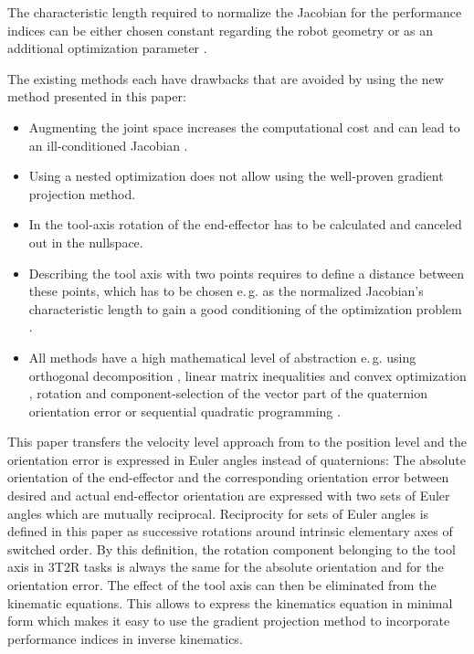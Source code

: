 \documentclass[twocolumn,10pt]{IFTOMM}
\begin{document}
The characteristic length required to normalize the Jacobian for the performance indices can be either chosen constant regarding the robot geometry \cite{ZhuQuCaoYan2013} or as an additional optimization parameter \cite{LegerAng2016}.

The existing methods each have drawbacks that are avoided by using the new method presented in this paper:
\begin{itemize}
    \item Augmenting the joint space \cite{Baron2000} increases the computational cost and can lead to an ill-conditioned Jacobian \cite{HuoBar2008}.
    \item Using a nested optimization \cite{ZhuQuCaoYan2013,GuoDonKe2015} does not allow using the well-proven gradient projection method.
    \item In \cite{Zlajpah2017} the tool-axis rotation of the end-effector has to be calculated and canceled out in the nullspace.
    \item Describing the tool axis with two points requires to define a distance between these points, which has to be chosen e.\,g. as the normalized Jacobian's characteristic length to gain a good conditioning of the optimization problem \cite{LegerAng2016}.
    \item All methods have a high mathematical level of abstraction e.\,g. using orthogonal decomposition \cite{HuoBar2008}, linear matrix inequalities and convex optimization \cite{FromGra2010}, rotation and component-selection of the vector part of the quaternion orientation error \cite{Zlajpah2017} or sequential quadratic programming \cite{LegerAng2016}.
\end{itemize}

This paper transfers the velocity level approach from \cite{Zlajpah2017} to the position level and the orientation error is expressed in Euler angles instead of quaternions:
%
The absolute orientation of the end-effector and the corresponding orientation error between desired and actual end-effector orientation are expressed with two sets of Euler angles which are mutually reciprocal.
Reciprocity for sets of Euler angles is defined in this paper as successive rotations around intrinsic elementary axes of switched order.
By this definition, the rotation component belonging to the tool axis in 3T2R tasks is always the same for the absolute orientation and for the orientation error.
The effect of the tool axis can then be eliminated from the kinematic equations.
This allows to express the kinematics equation in minimal form which makes it easy to use the gradient projection method to incorporate performance indices in inverse kinematics.
\end{document}
